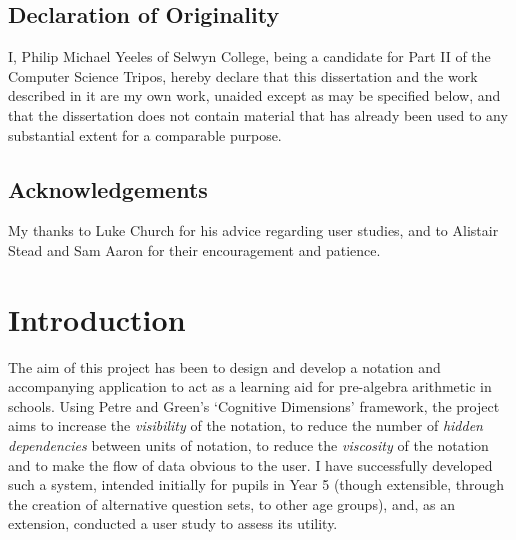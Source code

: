 \documentclass[12pt,twoside,notitlepage,xetex]{report}
\begin{document}
\newpage
\section*{Declaration of Originality}

I, Philip Michael Yeeles of Selwyn College, being a candidate for Part
II of the Computer Science Tripos, hereby declare that this dissertation
and the work described in it are my own work, unaided except as may be
specified below, and that the dissertation does not contain material
that has already been used to any substantial extent for a comparable
purpose.

\bigskip
{}

\medskip
{}

\cleardoublepage

\tableofcontents

\listoffigures

\newpage
\section*{Acknowledgements}
My thanks to Luke Church for his advice regarding user studies, and to Alistair
Stead and Sam Aaron for their encouragement and patience.


\cleardoublepage        %

\setcounter{page}{1}
\pagestyle{headings}

\chapter{Introduction}

The aim of this project has been to design and develop a notation and accompanying application to act as a learning aid for pre-algebra arithmetic in schools.  Using Petre and Green's `Cognitive Dimensions' framework, the project aims to increase the \emph{visibility} of the notation, to reduce the number of \emph{hidden dependencies} between units of notation, to reduce the \emph{viscosity} of the notation and to make the flow of data obvious to the user. \cite{Green1996}  I have successfully developed such a system, intended initially for pupils in Year 5 (though extensible, through the creation of alternative question sets, to other age groups), and, as an extension, conducted a user study to assess its utility.
\end{document}
